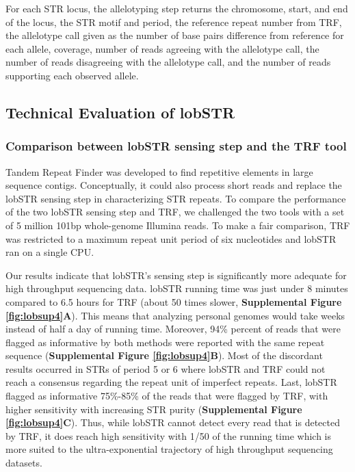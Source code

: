 For each STR locus, the allelotyping step returns the chromosome, start, and end of the locus, the STR motif and period, the reference repeat number from TRF, the allelotype call given as the number of base pairs difference from reference for each allele, coverage, number of reads agreeing with the allelotype call, the number of reads disagreeing with the allelotype call, and the number of reads supporting each observed allele.

\subsection{Technical Evaluation of lobSTR}
\subsubsection{Comparison between lobSTR sensing step and the TRF tool}
Tandem Repeat Finder was developed to find repetitive elements in large sequence contigs. Conceptually, it could also process short reads and replace the lobSTR sensing step in characterizing STR repeats. To compare the performance of the two lobSTR sensing step and TRF, we challenged the two tools with a set of 5 million 101bp whole-genome Illumina reads. To make a fair comparison, TRF was restricted to a maximum repeat unit period of six nucleotides and lobSTR ran on a single CPU. 

Our results indicate that lobSTR's sensing step is significantly more adequate for high throughput sequencing data. lobSTR running time was just under 8 minutes compared to 6.5 hours for TRF (about 50 times slower, \textbf{Supplemental Figure \ref{fig:lobsup4}A}). This means that analyzing personal genomes would take weeks instead of half a day of running time. Moreover, 94\% percent of reads that were flagged as informative by both methods were reported with the same repeat sequence (\textbf{Supplemental Figure \ref{fig:lobsup4}B}). Most of the discordant results occurred in STRs of period 5 or 6 where lobSTR and TRF could not reach a consensus regarding the repeat unit of imperfect repeats. Last, lobSTR flagged as informative 75\%-85\% of the reads that were flagged by TRF, with higher sensitivity with increasing STR purity (\textbf{Supplemental Figure \ref{fig:lobsup4}C}). Thus, while lobSTR cannot detect every read that is detected by TRF, it does reach high sensitivity with 1/50 of the running time which is more suited to the ultra-exponential trajectory of high throughput sequencing datasets. 

